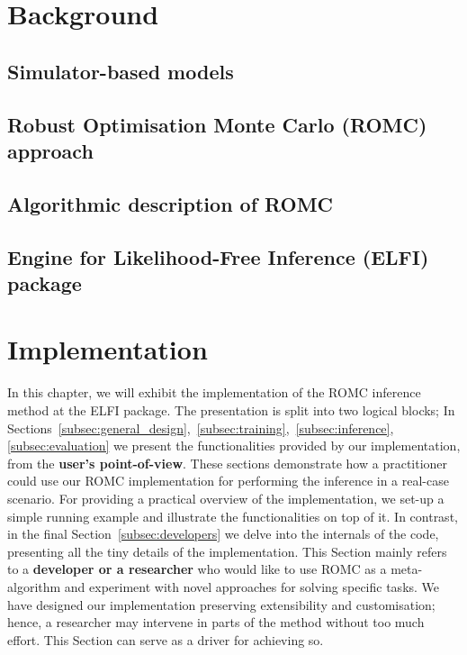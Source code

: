 \documentclass[11pt,twoside]{article}
\numberwithin{Theorem}{section}
\numberwithin{Definition}{section}
\numberwithin{Lemma}{section}
\numberwithin{Algorithm}{section}
\numberwithin{equation}{section}
\begin{document}
\clearpage
\section{Background}
\label{sec:background}

\subsection{Simulator-based models}
% 


\subsection{Robust Optimisation Monte Carlo (ROMC) approach}
\label{subsec:ROMC}
% 


\subsection{Algorithmic description of ROMC}
\label{subsec:romc-algorithmic}
% 


\subsection{Engine for Likelihood-Free Inference (ELFI) package}
\label{subsec:elfi}
% 


\clearpage
\section{Implementation}
In this chapter, we will exhibit the implementation of the ROMC
inference method at the ELFI package. The presentation is split into
two logical blocks; In
Sections~\ref{subsec:general_design},~\ref{subsec:training},~\ref{subsec:inference},
\ref{subsec:evaluation} we present the functionalities provided by our
implementation, from the \textbf{user's point-of-view}. These sections
demonstrate how a practitioner could use our ROMC implementation for
performing the inference in a real-case scenario. For providing a
practical overview of the implementation, we set-up a simple running
example and illustrate the functionalities on top of it. In contrast,
in the final Section~\ref{subsec:developers} we delve into the
internals of the code, presenting all the tiny details of the
implementation. This Section mainly refers to a \textbf{developer or a
  researcher} who would like to use ROMC as a meta-algorithm and
experiment with novel approaches for solving specific tasks. We have
designed our implementation preserving extensibility and
customisation; hence, a researcher may intervene in parts of the
method without too much effort. This Section can serve as a driver for
achieving so.
\end{document}
